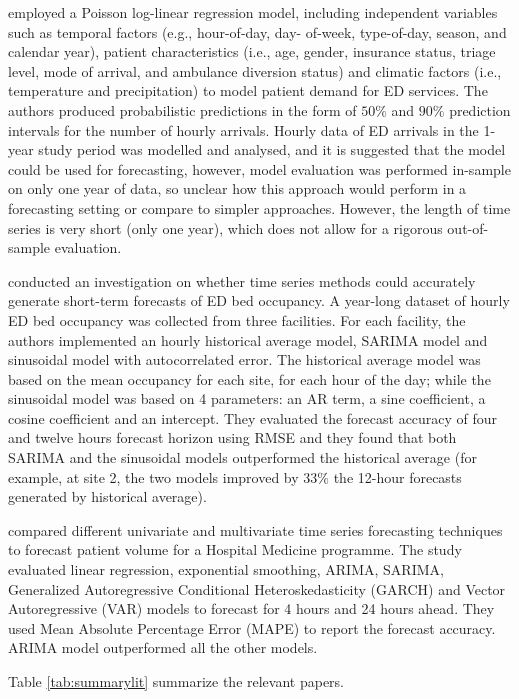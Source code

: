 \documentclass[]{elsarticle} %
\begin{document}
\citet{mccarthy2008challenge} employed a Poisson log-linear regression model, including independent variables such as temporal factors (e.g., hour-of-day, day- of-week, type-of-day, season, and calendar year), patient characteristics (i.e., age, gender, insurance status, triage level, mode of arrival, and ambulance diversion status) and climatic factors (i.e., temperature and precipitation) to model patient demand for ED services. The authors produced probabilistic predictions in the form of \(50\%\) and \(90\%\) prediction intervals for the number of hourly arrivals. Hourly data of ED arrivals in the 1-year study period was modelled and analysed, and it is suggested that the model could be used for forecasting, however, model evaluation was performed in-sample on only one year of data, so unclear how this approach would perform in a forecasting setting or compare to simpler approaches. However, the length of time series is very short (only one year), which does not allow for a rigorous out-of-sample evaluation.

\citet{schweigler2009forecasting} conducted an investigation on whether time series methods could accurately generate short-term forecasts of ED bed occupancy. A year-long dataset of hourly ED bed occupancy was collected from three facilities. For each facility, the authors implemented an hourly historical average model, SARIMA model and sinusoidal model with autocorrelated error. The historical average model was based on the mean occupancy for each site, for each hour of the day; while the sinusoidal model was based on 4 parameters: an AR term, a sine coefficient, a cosine coefficient and an intercept. They evaluated the forecast accuracy of four and twelve hours forecast horizon using RMSE and they found that both SARIMA and the sinusoidal models outperformed the historical average (for example, at site 2, the two models improved by \(33\%\) the 12-hour forecasts generated by historical average).

\citet{kim2014predicting} compared different univariate and multivariate time series forecasting techniques to forecast patient volume for a Hospital Medicine programme. The study evaluated linear regression, exponential smoothing, ARIMA, SARIMA, Generalized Autoregressive Conditional Heteroskedasticity (GARCH) and Vector Autoregressive (VAR) models to forecast for 4 hours and 24 hours ahead. They used Mean Absolute Percentage Error (MAPE) to report the forecast accuracy. ARIMA model outperformed all the other models.

Table \ref{tab:summarylit} summarize the relevant papers.
\end{document}
